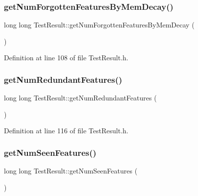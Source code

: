 \subsubsection{\texorpdfstring{get\+Num\+Forgotten\+Features\+By\+Mem\+Decay()}{getNumForgottenFeaturesByMemDecay()}}
{\footnotesize\ttfamily long long Test\+Result\+::get\+Num\+Forgotten\+Features\+By\+Mem\+Decay (\begin{DoxyParamCaption}{ }\end{DoxyParamCaption})\hspace{0.3cm}{\ttfamily [inline]}}



Definition at line 108 of file Test\+Result.\+h.

\mbox{\label{class_test_result_a2969cb491e01764d1ba6b55cb959f9be}} 
\subsubsection{\texorpdfstring{get\+Num\+Redundant\+Features()}{getNumRedundantFeatures()}}
{\footnotesize\ttfamily long long Test\+Result\+::get\+Num\+Redundant\+Features (\begin{DoxyParamCaption}{ }\end{DoxyParamCaption})\hspace{0.3cm}{\ttfamily [inline]}}



Definition at line 116 of file Test\+Result.\+h.

\mbox{\label{class_test_result_af31d71d5f3a86aabc5004e725b1c467c}} 
\subsubsection{\texorpdfstring{get\+Num\+Seen\+Features()}{getNumSeenFeatures()}}
{\footnotesize\ttfamily long long Test\+Result\+::get\+Num\+Seen\+Features (\begin{DoxyParamCaption}{ }\end{DoxyParamCaption})\hspace{0.3cm}{\ttfamily [inline]}}



